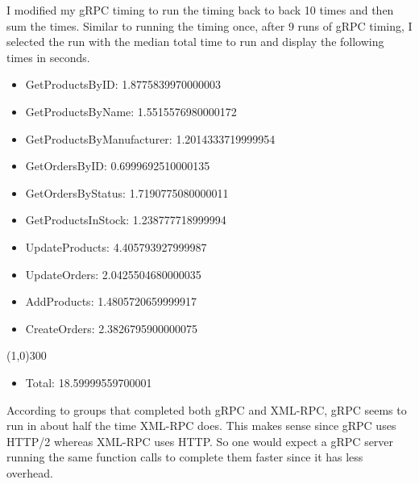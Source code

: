 \documentclass[12pt]{article}
\begin{document}
I modified my gRPC timing to run the timing back to back 10 times and then sum the times.
Similar to running the timing once, after 9 runs of gRPC timing, I selected the run with the median total time to run and display the following times in seconds.
\begin{itemize}
    \item[] GetProductsByID: 1.8775839970000003
    \item[] GetProductsByName: 1.5515576980000172
    \item[] GetProductsByManufacturer: 1.2014333719999954
    \item[] GetOrdersByID: 0.6999692510000135
    \item[] GetOrdersByStatus: 1.7190775080000011
    \item[] GetProductsInStock: 1.238777718999994
    \item[] UpdateProducts: 4.405793927999987
    \item[] UpdateOrders: 2.0425504680000035
    \item[] AddProducts: 1.4805720659999917
    \item[] CreateOrders: 2.3826795900000075
    \end{itemize}
    
    \vspace{-1.2em}
    \line(1,0){300}
    \vspace{-1em}
    
    \begin{itemize}
    \item[] Total: 18.59999559700001
    \end{itemize}


According to groups that completed both gRPC and XML-RPC, gRPC seems to run in about half the time XML-RPC does.
This makes sense since gRPC uses HTTP/2 whereas XML-RPC uses HTTP.
So one would expect a gRPC server running the same function calls to complete them faster since it has less overhead.
\end{document}
